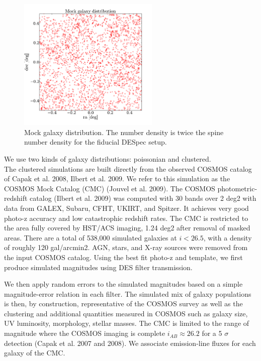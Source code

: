 \documentclass{article}
\begin{document}
\begin{figure}
\begin{center}
\includegraphics[keepaspectratio=true,width=0.6\textwidth]{mock_gals.pdf}
\caption{\label{fig:3}Mock galaxy distribution. The number density is
  twice the spine number density for the fiducial DESpec setup.} 
\end{center}
\end{figure}

We use two kinds of galaxy distributions: poissonian and clustered. \\ 

The clustered simulations are built directly from the observed COSMOS
catalog of Capak et al. 2008, Ilbert et al. 2009. We refer to this
simulation as the COSMOS Mock Catalog (CMC) (Jouvel et al. 2009). The
COSMOS photometric-redshift catalog (Ilbert et al. 2009) was computed
with 30 bands over 2 deg2 with data from GALEX, Subaru, CFHT, UKIRT,
and Spitzer. It achieves very good photo-z accuracy and low
catastrophic redshift rates. The CMC is restricted to the area fully
covered by HST/ACS imaging, 1.24 deg2 after removal of masked
areas. There are a total of 538,000 simulated galaxies at $i<26.5$,
with a density of roughly 120 gal/arcmin2. AGN, stars, and X-ray
sources were removed from the input COSMOS catalog. Using the best fit
photo-z and template, we first produce simulated magnitudes using DES
filter transmission. 

 We then apply random errors to the simulated magnitudes based on a
 simple magnitude-error relation in each filter. The simulated mix of
 galaxy populations is then, by construction, representative of the
 COSMOS survey as well as the clustering and additional quantities
 measured in COSMOS such as galaxy size, UV luminosity, morphology,
 stellar masses. The CMC is limited to the range of magnitude where
 the COSMOS imaging is complete $i_{AB} \approx 26.2$ for a 5 $\sigma$
 detection (Capak et al. 2007 and 2008). We associate emission-line
 fluxes for each galaxy of the CMC. 
\end{document}
